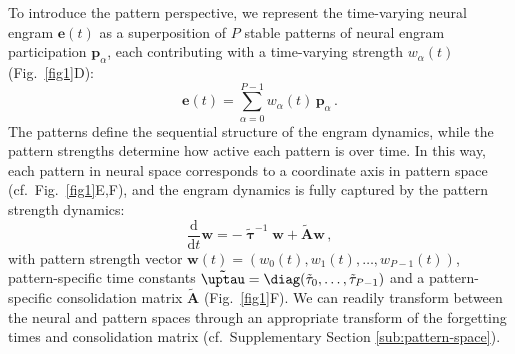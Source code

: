 To introduce the pattern perspective, we represent the time-varying neural engram $\mathbf{e}(t)$ as a superposition of $P$ stable patterns of neural engram participation $\mathbf{p}_{\alpha}$, each contributing with a time-varying strength $w_{\alpha}(t)$ (Fig.~\ref{fig1}D):
%
\begin{equation}\label{eq:pattern_to_engram}
\mathbf{e}(t) = \sum_{\alpha=0}^{P-1} w_{\alpha}(t) \, \mathbf{p}_{\alpha}\,.
\end{equation}
%
The patterns define the sequential structure of the engram dynamics, while the pattern strengths determine how active each pattern is over time. In this way, each pattern in neural space corresponds to a coordinate axis in pattern space (cf.~Fig.~\ref{fig1}E,F), and the engram dynamics is fully captured by the pattern strength dynamics:
%
\begin{equation}\label{eq:pattern_dynamics}
\frac{\mathrm{d}}{\mathrm{d}t} \mathbf{w} = -\boldsymbol{\tilde{\uptau}}^{-1} \mathbf{w} + \tilde{\mathbf{A}} \mathbf{w}\,,
\end{equation}
%
with pattern strength vector $\mathbf{w}(t) = (w_0(t), w_1(t), \ldots, w_{P-1}(t))$, pattern-specific time constants $\boldsymbol{\tilde{\uptau}} = \diag(\tilde{\tau}_0,\ldots,\tilde{\tau}_{P-1})$ and a pattern-specific consolidation matrix $\tilde{\mathbf{A}}$ (Fig.~\ref{fig1}F).
We can readily transform between the neural and pattern spaces through an appropriate transform of the forgetting times and consolidation matrix (cf.~Supplementary Section \ref{sub:pattern-space}).

